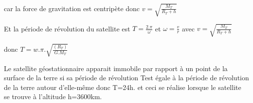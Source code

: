 \documentclass[12pt]{article}
\begin{document}
car la force de gravitation est centripète donc $v = \sqrt{\frac{M_T}{R_T + h}}$


Et la période de révolution du satellite est $T = \frac{2.\pi}{\omega}$ et $\omega = \frac{v}{r}$ avec $v = \sqrt{\frac{M_T}{R_T + h}}$

donc $T=w.\pi.\sqrt{\frac{(R_T)}{G.M_T}}$

\begin{tcolorbox}
Le satellite géostationnaire apparait immobile par rapport à un point de la surface de la terre si sa période de
révolution Test égale à la période de révolution de la terre autour d'elle-même donc T=24h. et ceci se réalise lorsque le satellite
se trouve à l'altitude h=3600km.
\end{tcolorbox}



\end{document}

